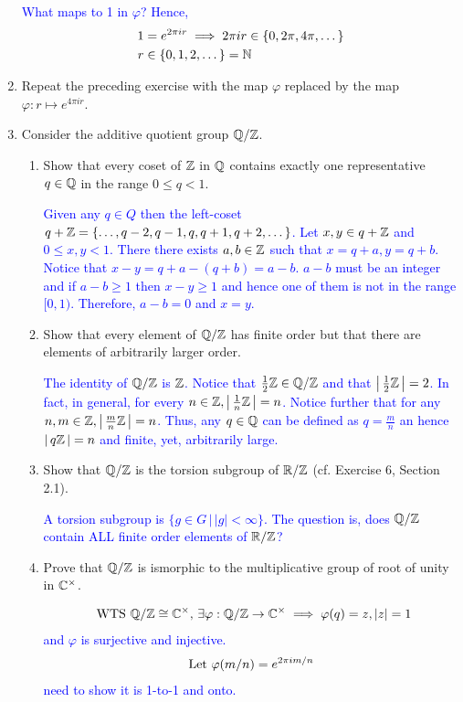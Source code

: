 \documentclass[10pt,a4paper]{report}
\newcommand{\BLUE}[1]{\textcolor{blue}{#1}}
\begin{document}
\begin{enumerate}
	\BLUE{What maps to 1 in $\varphi$?  Hence, 
	\begin{align*}
		1 &= e^{2\pi ir} \implies 2\pi ir \in \{0, 2\pi, 4\pi, \dots\} \\
		r &\in \{0,1,2,\dots\} = \mathbb{N}
	\end{align*}
	}
	
	\item Repeat the preceding exercise with the map $\varphi$ replaced by the map $\varphi:r \mapsto e^{4\pi ir}$.
	
	\item Consider the additive quotient group $\mathbb{Q}/\mathbb{Z}$.
	\begin{enumerate}
		\item Show that every coset of $\mathbb{Z}$ in $\mathbb{Q}$ contains exactly one representative $q \in \mathbb{Q}$ in the range $0\le q< 1$.
		
		\BLUE{Given any $q \in Q$ then the left-coset $q+\mathbb{Z} = \{\dots, q-2, q-1, q, q+1, q+2, \dots\}$.  Let $x,y \in q+\mathbb{Z}$ and $0\le x,y < 1$.  There there exists $a,b \in \mathbb{Z}$ such that $x = q+a, y=q+b$. Notice that $x-y=q+a-(q+b) = a-b$.  $a-b$ must be an integer and if $a-b \ge 1$ then $x-y \ge 1$ and hence one of them is not in the range $[0,1)$.  Therefore, $a-b=0$ and $x=y$.
		}
		
		\item Show that every element of $\mathbb{Q}/\mathbb{Z}$ has finite order but that there are elements of arbitrarily larger order.
		
		\BLUE{The identity of $\mathbb{Q}/\mathbb{Z}$ is $\mathbb{Z}$.  Notice that $\frac{1}{2}\mathbb{Z} \in \mathbb{Q}/\mathbb{Z}$ and that $\left |\, \frac{1}{2}\mathbb{Z} \,\right | = 2$.  In fact, in general, for every $n \in \mathbb{Z}, \left |\, \frac{1}{n}\mathbb{Z} \,\right | = n$.  Notice further that for any $n,m \in \mathbb{Z}, \left |\, \frac{m}{n}\mathbb{Z} \,\right | = n$.  Thus, any $q\in \mathbb{Q}$ can be defined as $q=\frac{m}{n}$ an hence $\left |\, q\mathbb{Z} \,\right |=n$ and finite, yet, arbitrarily large.
		}
		
		\item Show that $\mathbb{Q}/\mathbb{Z}$ is the torsion subgroup of $\mathbb{R}/\mathbb{Z}$ (cf. Exercise 6, Section 2.1).

		\BLUE{A torsion subgroup is $\{g \in G\,|\,|g|< \infty\}$.  The question is, does $\mathbb{Q}/\mathbb{Z}$ contain ALL finite order elements of $\mathbb{R}/\mathbb{Z}$?
		}		
		
		\item Prove that $\mathbb{Q}/\mathbb{Z}$ is ismorphic to the multiplicative group of root of unity in $\mathbb{C}^\times$.
		
		\BLUE{
		\begin{align*}
			\text{ WTS } \mathbb{Q}/\mathbb{Z} \cong \mathbb{C}^\times, \, \exists \varphi: \mathbb{Q}/\mathbb{Z}\to \mathbb{C}^\times \implies \varphi(q) = z, |z|=1
		\end{align*}and $\varphi$ is surjective and injective.
		\begin{align*}
			\text{Let } \varphi(m/n) = e^{2\pi i m/n}
		\end{align*}need to show it is 1-to-1 and onto.
		}
	\end{enumerate}
	

\end{enumerate}
\end{document}
